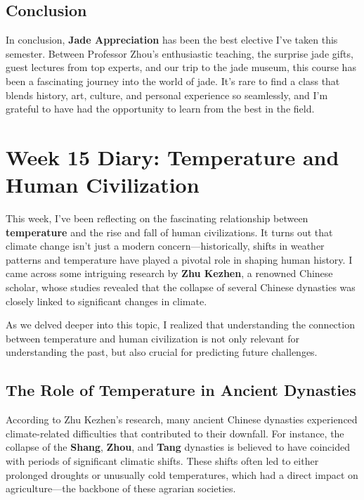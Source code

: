\documentclass[a4paper]{article} 	%
\begin{document}
\subsection*{Conclusion}

In conclusion, \textbf{Jade Appreciation} has been the best elective I’ve taken this semester. Between Professor Zhou’s enthusiastic teaching, the surprise jade gifts, guest lectures from top experts, and our trip to the jade museum, this course has been a fascinating journey into the world of jade. It’s rare to find a class that blends history, art, culture, and personal experience so seamlessly, and I’m grateful to have had the opportunity to learn from the best in the field.


\section{Week 15 Diary: Temperature and Human Civilization}

This week, I’ve been reflecting on the fascinating relationship between \textbf{temperature} and the rise and fall of human civilizations. It turns out that climate change isn’t just a modern concern—historically, shifts in weather patterns and temperature have played a pivotal role in shaping human history. I came across some intriguing research by \textbf{Zhu Kezhen}, a renowned Chinese scholar, whose studies revealed that the collapse of several Chinese dynasties was closely linked to significant changes in climate. 

As we delved deeper into this topic, I realized that understanding the connection between temperature and human civilization is not only relevant for understanding the past, but also crucial for predicting future challenges.

\subsection*{The Role of Temperature in Ancient Dynasties}

According to Zhu Kezhen’s research, many ancient Chinese dynasties experienced climate-related difficulties that contributed to their downfall. For instance, the collapse of the \textbf{Shang}, \textbf{Zhou}, and \textbf{Tang} dynasties is believed to have coincided with periods of significant climatic shifts. These shifts often led to either prolonged droughts or unusually cold temperatures, which had a direct impact on agriculture—the backbone of these agrarian societies.
\end{document}
